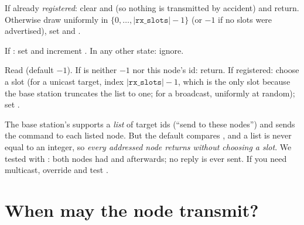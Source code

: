 \begin{description}[leftmargin=0.4cm,font=\sffamily\bfseries]
 \item[\code{send_id}.] If already \emph{registered}: clear  and  (so nothing is transmitted by accident) and return. Otherwise draw  uniformly in $\{0,\dots,|\texttt{rx\_slots}|-1\}$ (or $-1$ if no slots were advertised), set  and .
 \item[\code{ack}.] If : set  and increment . In any other state: ignore.
 \item[\code{send_data}.] Read  (default $-1$). If  is neither $-1$ nor this node's id: return. If registered: choose a slot (for a unicast target, index $|\texttt{rx\_slots}|-1$, which is the only slot because the base station truncates the list to one; for a broadcast, uniformly at random); set .
\end{description}

\begin{reality}
The base station's  supports a \emph{list} of target ids (``send to these nodes'') and sends the command to each listed node. But the default  compares , and a list is never equal to an integer, so \emph{every addressed node returns without choosing a slot}. We tested with : both nodes had  and  afterwards; no reply is ever sent. If you need multicast, override  and test .
\end{reality}

\section{When may the node transmit?}
\label{sec:txready}

